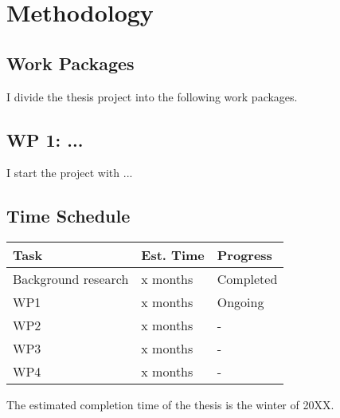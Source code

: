 
\section{Methodology}

\lipsum[8-8]

\subsection{Work Packages}

I divide the thesis project into the following work packages.

\subsection*{WP 1: ...}

I start the project with ...

\subsection{Time Schedule}

\lipsum[9-9]

\begin{table}[h!]
\centering
\begin{tabular}{ l l l }
  \hline
  Task & Est. Time & Progress \\ \hline
  Background research & x months & Completed \\
  WP1 & x months & Ongoing \\
  WP2 & x months & - \\
  WP3 & x months & - \\
  WP4 & x months & - \\ \hline
\end{tabular}
\end{table}

The estimated completion time of the thesis is the winter of 20XX.